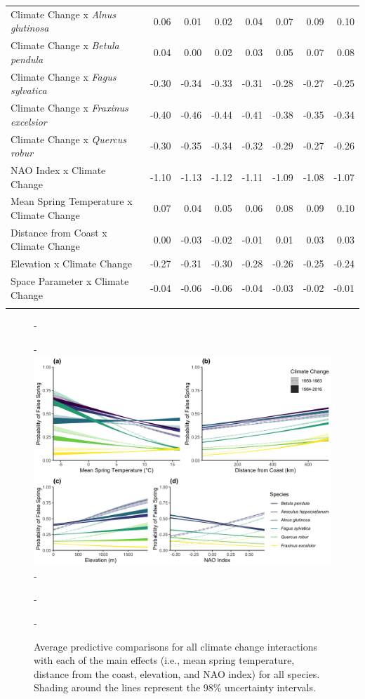 \documentclass{article}\usepackage[]{graphicx}\usepackage[]{color}
\begin{document}
\begin{longtable}{lrrrrrrr}
  Climate Change
x\textit{ Alnus glutinosa} & 0.06 & 0.01 & 0.02 & 0.04 & 0.07 & 0.09 & 0.10 \\ 
  Climate Change
x\textit{ Betula pendula} & 0.04 & 0.00 & 0.02 & 0.03 & 0.05 & 0.07 & 0.08 \\ 
  Climate Change
x\textit{ Fagus sylvatica} & -0.30 & -0.34 & -0.33 & -0.31 & -0.28 & -0.27 & -0.25 \\ 
  Climate Change
x\textit{ Fraxinus excelsior} & -0.40 & -0.46 & -0.44 & -0.41 & -0.38 & -0.35 & -0.34 \\ 
  Climate Change
x\textit{ Quercus robur} & -0.30 & -0.35 & -0.34 & -0.32 & -0.29 & -0.27 & -0.26 \\ 
  NAO Index x Climate Change & -1.10 & -1.13 & -1.12 & -1.11 & -1.09 & -1.08 & -1.07 \\ 
  Mean Spring 
Temperature x Climate Change & 0.07 & 0.04 & 0.05 & 0.06 & 0.08 & 0.09 & 0.10 \\ 
  Distance from 
Coast x Climate Change & 0.00 & -0.03 & -0.02 & -0.01 & 0.01 & 0.03 & 0.03 \\ 
  Elevation x Climate Change & -0.27 & -0.31 & -0.30 & -0.28 & -0.26 & -0.25 & -0.24 \\ 
  Space Parameter x Climate Change & -0.04 & -0.06 & -0.06 & -0.04 & -0.03 & -0.02 & -0.01 \\ 
   \hline
\hline
\label{tab:suppmodlong}
\end{longtable}



{\begin{figure} [H]
  -\begin{center}
  -\includegraphics[width=16cm]{..//analyses/figures/APC_allpred_allspp_baseR_long98.png}
  -\caption{Average predictive comparisons for all climate change interactions with each of the main effects (i.e., mean spring temperature, distance from the coast, elevation, and NAO index) for all species. Shading around the lines represent the 98\% uncertainty intervals. }\label{fig:suppapc}
  -\end{center}
  -\end{figure}}
  
\end{document}

